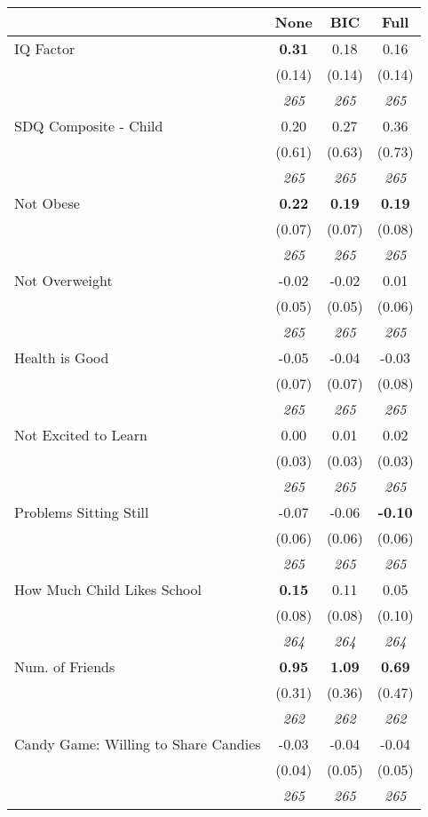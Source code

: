 \begin{tabular}{l c c c}
\toprule
 & None & BIC & Full \\
\midrule
IQ Factor & \textbf{ 0.31 } & 0.18 & 0.16 \\
& (0.14) & (0.14) & (0.14) \\
& \textit{ 265 } & \textit{ 265 } & \textit{ 265 } \\
SDQ Composite - Child & 0.20 & 0.27 & 0.36 \\
& (0.61) & (0.63) & (0.73) \\
& \textit{ 265 } & \textit{ 265 } & \textit{ 265 } \\
Not Obese & \textbf{ 0.22 } & \textbf{ 0.19 } & \textbf{ 0.19 } \\
& (0.07) & (0.07) & (0.08) \\
& \textit{ 265 } & \textit{ 265 } & \textit{ 265 } \\
Not Overweight & -0.02 & -0.02 & 0.01 \\
& (0.05) & (0.05) & (0.06) \\
& \textit{ 265 } & \textit{ 265 } & \textit{ 265 } \\
Health is Good & -0.05 & -0.04 & -0.03 \\
& (0.07) & (0.07) & (0.08) \\
& \textit{ 265 } & \textit{ 265 } & \textit{ 265 } \\
Not Excited to Learn & 0.00 & 0.01 & 0.02 \\
& (0.03) & (0.03) & (0.03) \\
& \textit{ 265 } & \textit{ 265 } & \textit{ 265 } \\
Problems Sitting Still & -0.07 & -0.06 & \textbf{ -0.10 } \\
& (0.06) & (0.06) & (0.06) \\
& \textit{ 265 } & \textit{ 265 } & \textit{ 265 } \\
How Much Child Likes School & \textbf{ 0.15 } & 0.11 & 0.05 \\
& (0.08) & (0.08) & (0.10) \\
& \textit{ 264 } & \textit{ 264 } & \textit{ 264 } \\
Num. of Friends & \textbf{ 0.95 } & \textbf{ 1.09 } & \textbf{ 0.69 } \\
& (0.31) & (0.36) & (0.47) \\
& \textit{ 262 } & \textit{ 262 } & \textit{ 262 } \\
Candy Game: Willing to Share Candies & -0.03 & -0.04 & -0.04 \\
& (0.04) & (0.05) & (0.05) \\
& \textit{ 265 } & \textit{ 265 } & \textit{ 265 } \\
\bottomrule
\end{tabular}
